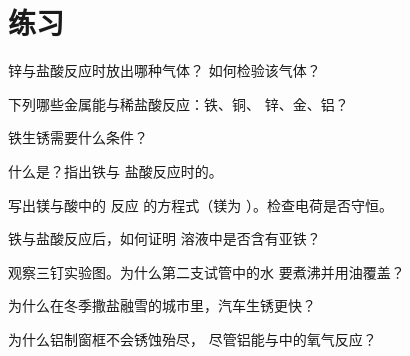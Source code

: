 \section{练习}

\begin{exercise}[$\star$]\label{exo:g9:metals-acids-corrosion:1}
锌与盐酸反应时放出哪种气体？
如何检验该气体？
\end{exercise}

\begin{exercise}[$\star$]\label{exo:g9:metals-acids-corrosion:2}
下列哪些金属能与稀盐酸反应：铁、铜、
锌、金、铝？
\end{exercise}

\begin{exercise}[$\star$]\label{exo:g9:metals-acids-corrosion:3}
铁生锈需要什么条件？
\end{exercise}

\begin{exercise}[$\star$]\label{exo:g9:metals-acids-corrosion:4}
什么是？指出铁与
盐酸反应时的。
\end{exercise}

\begin{exercise}[$\star\star$]\label{exo:g9:metals-acids-corrosion:5}
写出镁与酸中的  反应
的方程式（镁为 ）。检查电荷是否守恒。
\end{exercise}

\begin{exercise}[$\star\star$]\label{exo:g9:metals-acids-corrosion:6}
铁与盐酸反应后，如何证明
溶液中是否含有亚铁？
\end{exercise}

\begin{exercise}[$\star\star$]\label{exo:g9:metals-acids-corrosion:7}
观察三钉实验图。为什么第二支试管中的水
要煮沸并用油覆盖？
\end{exercise}

\begin{exercise}[$\star\star$]\label{exo:g9:metals-acids-corrosion:8}
为什么在冬季撒盐融雪的城市里，汽车生锈更快？
\end{exercise}

\begin{exercise}[$\star\star$]\label{exo:g9:metals-acids-corrosion:9}
为什么铝制窗框不会锈蚀殆尽，
尽管铝能与中的氧气反应？
\end{exercise}

